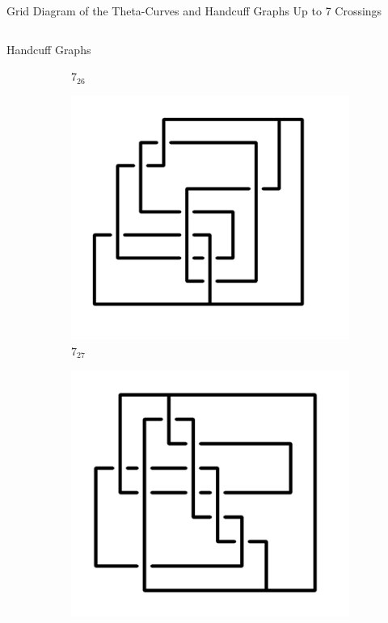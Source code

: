 \documentclass[final]{beamer}
\begin{document}
\begin{frame}[t]
\begin{alertblock}{Grid Diagram of the Theta-Curves and Handcuff Graphs Up to 7 Crossings}
\begin{columns}[t]
\begin{column}{0.5\textwidth}
\begin{alertblock}{Handcuff Graphs}
\begin{figure}
\begin{subfigure}{0.075\textwidth}
    \caption{$7_{26}$} 
    \end{subfigure}
    \begin{subfigure}{0.075\textwidth}
    \includegraphics[width=\columnwidth]{../Midterm_Poster/grid_diagram/handcuff_7_27.png}
    \caption{$7_{27}$} 
    \end{subfigure}
    \begin{subfigure}{0.075\textwidth}
    \includegraphics[width=\columnwidth]{../Midterm_Poster/grid_diagram/handcuff_7_28.png}

\end{subfigure}
\end{figure}
\end{alertblock}
\end{column}
\end{columns}
\end{alertblock}
\end{frame}
\end{document}
